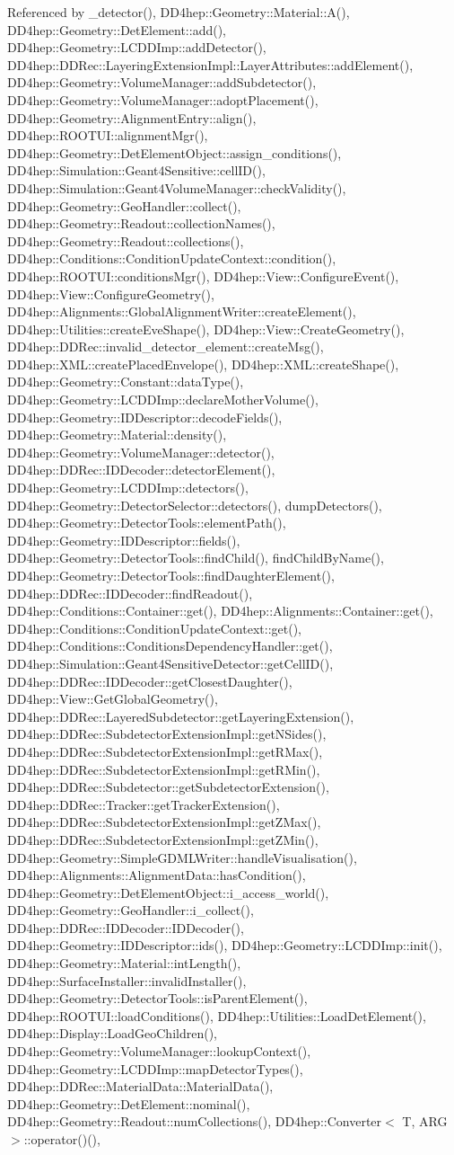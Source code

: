 Referenced by \_\-detector(), DD4hep::Geometry::Material::A(), DD4hep::Geometry::DetElement::add(), DD4hep::Geometry::LCDDImp::addDetector(), DD4hep::DDRec::LayeringExtensionImpl::LayerAttributes::addElement(), DD4hep::Geometry::VolumeManager::addSubdetector(), DD4hep::Geometry::VolumeManager::adoptPlacement(), DD4hep::Geometry::AlignmentEntry::align(), DD4hep::ROOTUI::alignmentMgr(), DD4hep::Geometry::DetElementObject::assign\_\-conditions(), DD4hep::Simulation::Geant4Sensitive::cellID(), DD4hep::Simulation::Geant4VolumeManager::checkValidity(), DD4hep::Geometry::GeoHandler::collect(), DD4hep::Geometry::Readout::collectionNames(), DD4hep::Geometry::Readout::collections(), DD4hep::Conditions::ConditionUpdateContext::condition(), DD4hep::ROOTUI::conditionsMgr(), DD4hep::View::ConfigureEvent(), DD4hep::View::ConfigureGeometry(), DD4hep::Alignments::GlobalAlignmentWriter::createElement(), DD4hep::Utilities::createEveShape(), DD4hep::View::CreateGeometry(), DD4hep::DDRec::invalid\_\-detector\_\-element::createMsg(), DD4hep::XML::createPlacedEnvelope(), DD4hep::XML::createShape(), DD4hep::Geometry::Constant::dataType(), DD4hep::Geometry::LCDDImp::declareMotherVolume(), DD4hep::Geometry::IDDescriptor::decodeFields(), DD4hep::Geometry::Material::density(), DD4hep::Geometry::VolumeManager::detector(), DD4hep::DDRec::IDDecoder::detectorElement(), DD4hep::Geometry::LCDDImp::detectors(), DD4hep::Geometry::DetectorSelector::detectors(), dumpDetectors(), DD4hep::Geometry::DetectorTools::elementPath(), DD4hep::Geometry::IDDescriptor::fields(), DD4hep::Geometry::DetectorTools::findChild(), findChildByName(), DD4hep::Geometry::DetectorTools::findDaughterElement(), DD4hep::DDRec::IDDecoder::findReadout(), DD4hep::Conditions::Container::get(), DD4hep::Alignments::Container::get(), DD4hep::Conditions::ConditionUpdateContext::get(), DD4hep::Conditions::ConditionsDependencyHandler::get(), DD4hep::Simulation::Geant4SensitiveDetector::getCellID(), DD4hep::DDRec::IDDecoder::getClosestDaughter(), DD4hep::View::GetGlobalGeometry(), DD4hep::DDRec::LayeredSubdetector::getLayeringExtension(), DD4hep::DDRec::SubdetectorExtensionImpl::getNSides(), DD4hep::DDRec::SubdetectorExtensionImpl::getRMax(), DD4hep::DDRec::SubdetectorExtensionImpl::getRMin(), DD4hep::DDRec::Subdetector::getSubdetectorExtension(), DD4hep::DDRec::Tracker::getTrackerExtension(), DD4hep::DDRec::SubdetectorExtensionImpl::getZMax(), DD4hep::DDRec::SubdetectorExtensionImpl::getZMin(), DD4hep::Geometry::SimpleGDMLWriter::handleVisualisation(), DD4hep::Alignments::AlignmentData::hasCondition(), DD4hep::Geometry::DetElementObject::i\_\-access\_\-world(), DD4hep::Geometry::GeoHandler::i\_\-collect(), DD4hep::DDRec::IDDecoder::IDDecoder(), DD4hep::Geometry::IDDescriptor::ids(), DD4hep::Geometry::LCDDImp::init(), DD4hep::Geometry::Material::intLength(), DD4hep::SurfaceInstaller::invalidInstaller(), DD4hep::Geometry::DetectorTools::isParentElement(), DD4hep::ROOTUI::loadConditions(), DD4hep::Utilities::LoadDetElement(), DD4hep::Display::LoadGeoChildren(), DD4hep::Geometry::VolumeManager::lookupContext(), DD4hep::Geometry::LCDDImp::mapDetectorTypes(), DD4hep::DDRec::MaterialData::MaterialData(), DD4hep::Geometry::DetElement::nominal(), DD4hep::Geometry::Readout::numCollections(), DD4hep::Converter$<$ T, ARG $>$::operator()(), 